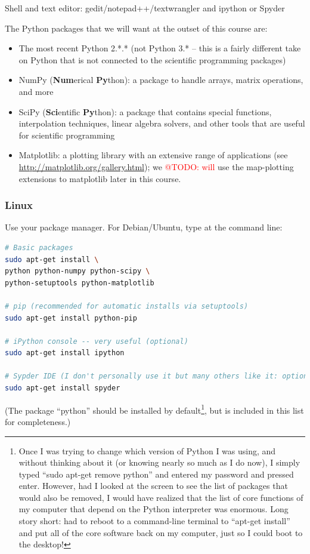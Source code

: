 \documentclass[a4paper,10pt]{scrartcl}
\makeatletter
\newcommand{\todo}[1]{\textcolor{red}{@TODO: #1}}
\makeatother
\begin{document}
Shell and text editor: gedit/notepad++/textwrangler and ipython or Spyder


The Python packages that we will want at the outset of this course are:
\begin{itemize}
 \item The most recent Python 2.*.* (not Python 3.* -- this is a fairly different take on Python that is not connected to the scientific programming packages)
 \item NumPy (\textbf{Num}erical \textbf{Py}thon): a package to handle arrays, matrix operations, and more
 \item SciPy (\textbf{Sci}entific \textbf{Py}thon): a package that contains special functions, interpolation techniques, linear algebra solvers, and other tools that are useful for scientific programming
 \item Matplotlib: a plotting library with an extensive range of applications (see \url{http://matplotlib.org/gallery.html}); we \todo{will} use the map-plotting extensions to matplotlib later in this course.
\end{itemize}

\subsubsection{Linux}

Use your package manager. For Debian/Ubuntu, type at the command line:

\begin{lstlisting}[language=sh]
# Basic packages
sudo apt-get install \
python python-numpy python-scipy \
python-setuptools python-matplotlib 

# pip (recommended for automatic installs via setuptools)
sudo apt-get install python-pip

# iPython console -- very useful (optional)
sudo apt-get install ipython

# Sypder IDE (I don't personally use it but many others like it: optional)
sudo apt-get install spyder
\end{lstlisting}

(The package ``python'' should be installed by default\footnote{Once I was trying to change which version of Python I was using, and without thinking about it (or knowing nearly so much as I do now), I simply typed ``sudo apt-get remove python'' and entered my password and pressed enter. However, had I looked at the screen to see the list of packages that  would also be removed, I would have realized that the list of core functions of my computer that depend on the Python interpreter was enormous. Long story short: had to reboot to a command-line terminal to ``apt-get install'' and put all of the core software back on my computer, just so I could boot to the desktop!}, but is included in this list for completeness.)
\end{document}
